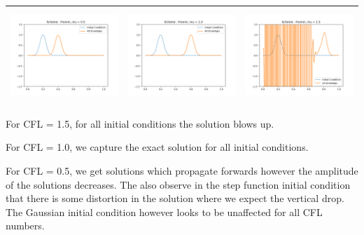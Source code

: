 \documentclass[a4paper,twoside,11pt]{article}
\begin{document}
\begin{table}[!h]
\begin{tabular}{ | c | m{5cm} | m{5cm} | }
            \begin{minipage}{.3\textwidth}
              \includegraphics[width=\linewidth, height=3.5cm]{../plots/scheme6-IC5-mu0_5.png}
            \end{minipage}
            &
            \begin{minipage}{.3\textwidth}
              \includegraphics[width=\linewidth, height=3.5cm]{../plots/scheme6-IC5-mu1_0.png}
            \end{minipage}
            &
            \begin{minipage}{.3\textwidth}
              \includegraphics[width=\linewidth, height=3.5cm]{../plots/scheme6-IC5-mu1_5.png}
            \end{minipage} \\
            \hline
          \end{tabular}
        \end{table}

        For CFL = 1.5, for all initial conditions the solution blows up.

        For CFL = 1.0, we capture the exact solution for all initial conditions.

        For CFL = 0.5, we get solutions which propagate forwards however the amplitude of the solutions decreases. The also observe in the step function initial condition that there is some distortion in the solution where we expect the vertical drop. The Gaussian initial condition however looks to be unaffected for all CFL numbers.
\end{document}

